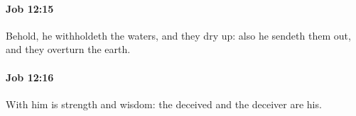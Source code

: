 		\paragraph{Job 12:15} %
			\label{JOB-12-15}

			Behold, he withholdeth the waters, and they dry up: also he sendeth them out, and they overturn the earth.


		\paragraph{Job 12:16} %
			\label{JOB-12-16}

			With him is strength and wisdom: the deceived and the deceiver are his.


